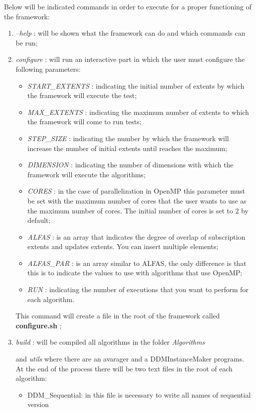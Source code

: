 \documentclass[a4paper,11pt]{report}
\newcommand{\folder}[1]{
  \textcolor{foldercolor}{\textit{#1}}
}
\newcommand{\command}[1]{
  \textcolor{commandcolor}{\textit{#1}}
}
\newcommand{\bashvariable}[1]{
  \textcolor{bashvariable}{\textit{#1}}
}
\newcommand{\bashfile}[1]{
  \textcolor{bashfilecolor}{\textbf{#1}}
}
\begin{document}
 Below will be indicated commands in order to execute for a proper functioning of the framework:
 \begin{enumerate}
  \item \command{--help}: will be shown what the framework can do and which commands can be run;
  \item \command{configure}: will run an interactive part in which the user must configure the following 
  parameters:
  \begin{itemize}
   \item \bashvariable{START\_EXTENTS}: indicating the initial number of extents by which the 
   framework will execute the test;
   \item \bashvariable{MAX\_EXTENTS}: indicating the maximum number of extents to which the 
   framework will come to run tests;
   \item \bashvariable{STEP\_SIZE}: indicating the number by which the framework will increase 
   the number of initial extents until reaches the maximum;
   \item \bashvariable{DIMENSION}: indicating the number of dimensions with which the framework 
   will execute the algorithms;
   \item \bashvariable{CORES}: in the case of parallelization in OpenMP this parameter must 
   be set with the maximum number of cores that the user wants to use as the maximum number of cores. 
   The initial number of cores is set to 2 by default;
   \item \bashvariable{ALFAS}: is an array that indicates the degree of overlap of subscription extents 
   and updates extents. You can insert multiple elements;
   \item \bashvariable{ALFAS\_PAR}: is an array similar to ALFAS, the only difference is that 
   this is to indicate the values to use with algorithms that use OpenMP;
   \item \bashvariable{RUN}: indicating the number of executions that you want to perform for each algorithm.
  \end{itemize}
  This command will create a file in the root of the framework called \bashfile{configure.sh};
  \item \command{build}: will be compiled all algorithms in the folder \folder{Algorithms} 
  and \folder{utils} where there are an avarager and a DDMInstanceMaker programs.
  At the end of the process there will be two text files in the root of each algorithm:
  \begin{itemize}
   \item DDM\_Sequential: in this file is necessary to write all names of sequential version 

\end{itemize}
\end{enumerate}
\end{document}
